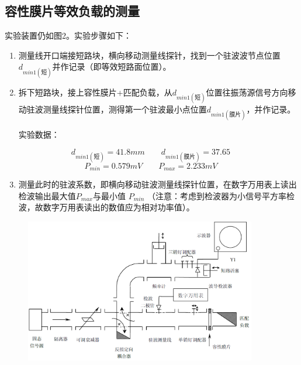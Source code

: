 \documentclass{../source/Experiment}
\begin{document}
        \subsection{容性膜片等效负载的测量}
        实验装置仍如图2。实验步骤如下：
            \begin{enumerate}
                \item 测量线开口端接短路块，横向移动测量线探针，找到一个驻波波节点位置$d_{min1(\mbox{短})}$并作记录（即等效短路面位置）。
                \item 拆下短路块，接上容性膜片+匹配负载，从$d_{min1(\mbox{短})}$位置往振荡源信号方向移动驻波测量线探针位置，测得第一个驻波最小点位置$d_{min1(\mbox{膜片})}$，并作记录。
                
                实验数据：

                $$d_{min1(\mbox{短})} = 41.8mm \qquad d_{min1(\mbox{膜片})} = 37.65\qquad$$
                $$P_{min} = 0.579mV\qquad P_{max} = 2.233mV\qquad$$

                \item 测量此时的驻波系数，即横向移动驻波测量线探针位置，在数字万用表上读出检波输出最大值$P_{max}$与最小值 $P_{min}$ （注意：考虑到检波器为小信号平方率检波，故数字万用表读出的数值应为相对功率值）。
            \end{enumerate}

            \begin{figure}[H]
                \centering
                \includegraphics[width = 0.9\textwidth]{pic/1-4.png}
                \caption{}
            \end{figure}
\end{document}
